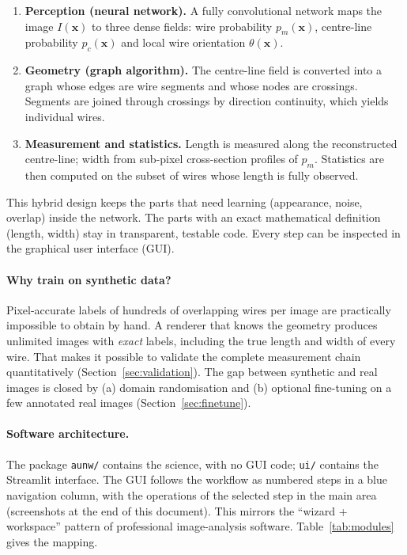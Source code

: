 \documentclass[11pt,a4paper]{article}
\newcommand{\code}[1]{\texttt{#1}}
\begin{document}
\begin{enumerate}[leftmargin=*,itemsep=1pt]
\item \textbf{Perception (neural network).} A fully convolutional network maps the image $I(\mathbf x)$ to three dense fields: wire probability $p_m(\mathbf x)$, centre-line probability $p_c(\mathbf x)$ and local wire orientation $\theta(\mathbf x)$.
\item \textbf{Geometry (graph algorithm).} The centre-line field is converted into a graph whose edges are wire segments and whose nodes are crossings. Segments are joined through crossings by direction continuity, which yields individual wires.
\item \textbf{Measurement and statistics.} Length is measured along the reconstructed centre-line; width from sub-pixel cross-section profiles of $p_m$. Statistics are then computed on the subset of wires whose length is fully observed.
\end{enumerate}
This hybrid design keeps the parts that need learning (appearance, noise, overlap) inside the network. The parts with an exact mathematical definition (length, width) stay in transparent, testable code. Every step can be inspected in the graphical user interface (GUI).

\paragraph{Why train on synthetic data?} Pixel-accurate labels of hundreds of overlapping wires per image are practically impossible to obtain by hand. A renderer that knows the geometry produces unlimited images with \emph{exact} labels, including the true length and width of every wire. That makes it possible to validate the complete measurement chain quantitatively (Section~\ref{sec:validation}). The gap between synthetic and real images is closed by (a) domain randomisation and (b) optional fine-tuning on a few annotated real images (Section~\ref{sec:finetune}).

\paragraph{Software architecture.} The package \code{aunw/} contains the science, with no GUI code; \code{ui/} contains the Streamlit interface. The GUI follows the workflow as numbered steps in a blue navigation column, with the operations of the selected step in the main area (screenshots at the end of this document). This mirrors the ``wizard + workspace'' pattern of professional image-analysis software. Table~\ref{tab:modules} gives the mapping.
\end{document}
